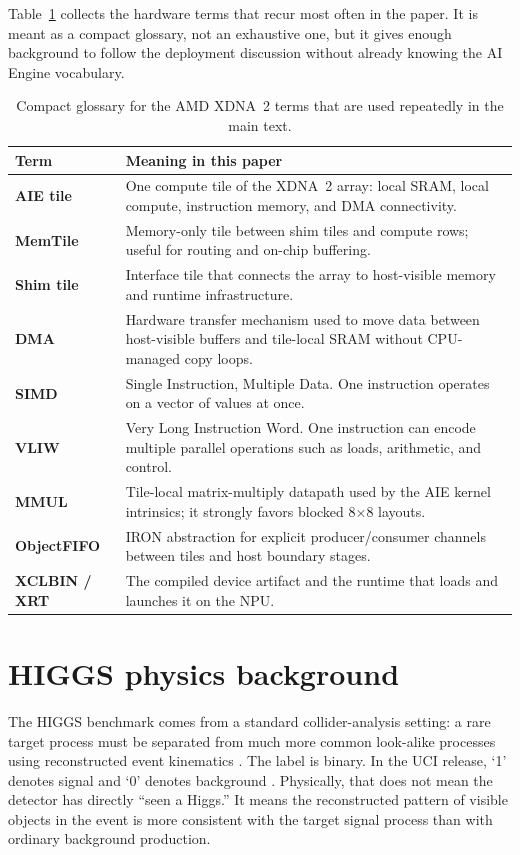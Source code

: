 \documentclass[a4paper,11pt]{article}
\begin{document}
Table~\ref{tab:npu-glossary} collects the hardware terms that recur most often
in the paper. It is meant as a compact glossary, not an exhaustive one, but it
gives enough background to follow the deployment discussion without already
knowing the AI Engine vocabulary.

\begin{table}[H]
\centering
\small
\begin{tabularx}{\textwidth}{@{}>{\bfseries}p{}X@{}}
\toprule
Term & Meaning in this paper \\
\midrule
AIE tile & One compute tile of the XDNA~2 array: local SRAM, local compute, instruction memory, and DMA connectivity. \\
MemTile & Memory-only tile between shim tiles and compute rows; useful for routing and on-chip buffering. \\
Shim tile & Interface tile that connects the array to host-visible memory and runtime infrastructure. \\
DMA & Hardware transfer mechanism used to move data between host-visible buffers and tile-local SRAM without CPU-managed copy loops. \\
SIMD & Single Instruction, Multiple Data. One instruction operates on a vector of values at once. \\
VLIW & Very Long Instruction Word. One instruction can encode multiple parallel operations such as loads, arithmetic, and control. \\
MMUL & Tile-local matrix-multiply datapath used by the AIE kernel intrinsics; it strongly favors blocked 8$\times$8 layouts. \\
ObjectFIFO & IRON abstraction for explicit producer/consumer channels between tiles and host boundary stages. \\
XCLBIN / XRT & The compiled device artifact and the runtime that loads and launches it on the NPU. \\
\bottomrule
\end{tabularx}
\caption{Compact glossary for the AMD XDNA~2 terms that are used repeatedly in
the main text.}
\label{tab:npu-glossary}
\end{table}

\FloatBarrier
\clearpage
\section{HIGGS physics background}

The HIGGS benchmark comes from a standard collider-analysis setting: a rare
target process must be separated from much more common look-alike processes
using reconstructed event kinematics \cite{baldi-higgs}. The label is binary.
In the UCI release, `1' denotes signal and `0' denotes background
\cite{uci-higgs}. Physically, that does not mean the detector has directly
``seen a Higgs.'' It means the reconstructed pattern of visible objects in the
event is more consistent with the target signal process than with ordinary
background production.
\end{document}
